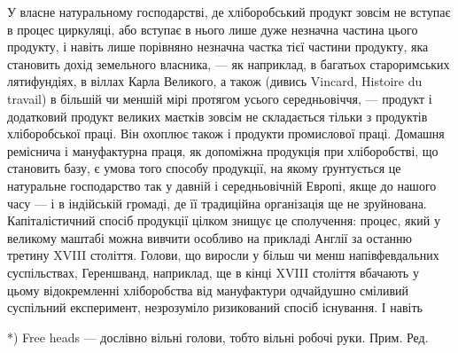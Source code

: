 У власне натуральному господарстві, де хліборобський продукт зовсім не
вступає в процес циркуляці, або вступає в нього лише дуже незначна частина
цього продукту, і навіть лише порівняно незначна частка тієї частини продукту,
яка становить дохід земельного власника, — як наприклад, в багатьох
староримських лятифундіях, в віллах Карла Великого, а також (дивись Vincard,
Histoire du travail) в більшій чи меншій мірі протягом усього середньовіччя, —
продукт і додатковий продукт великих маєтків зовсім не складається тільки
з продуктів хліборобської праці. Він охоплює також і продукти промислової
праці. Домашня реміснича і мануфактурна праця, як допоміжна продукція
при хліборобстві, що становить базу, є умова того способу продукції, на якому
ґрунтується це натуральне господарство так у давній і середньовічній Европі, якще
до нашого часу — і в індійській громаді, де її традиційна організація ще не
зруйнована. Капіталістичний спосіб продукції цілком знищує це сполучення:
процес, який у великому маштабі можна вивчити особливо на прикладі Англії
за останню третину XVIII століття. Голови, що виросли у більш чи менш напівфевдальних
суспільствах, Гереншванд, наприклад, ще в кінці XVIII століття
вбачають у цьому відокремленні хліборобства від мануфактури одчайдушно сміливий
суспільний експеримент, незрозуміло ризикований спосіб існування. І навіть

*) Free heads — дослівно вільні голови, тобто вільні робочі руки. Прим. Ред.
